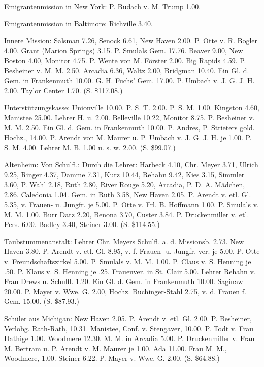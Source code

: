 Emigrantenmission in New York: P. Budach v. M. Trump 1.00.

Emigrantenmission in Baltimore: Richville 3.40.

Innere Mission: Salsman 7.26, Senock 6.61, New Haven 2.00. P. Otte v. R. Bogler 4.00. Grant (Marion Springs) 3.15. P. Smulals Gem. 17.76. Beaver 9.00, New Boston 4.00, Monitor 4.75. P. Wente von M. Förster 2.00. Big Rapids 4.59. P. Besheiner v. M. M. 2.50. Arcadia 6.36, Waltz 2.00, Bridgman 10.40. Ein Gl. d. Gem. in Frankenmuth 10.00. G. H. Fuchs’ Gem. 17.00. P. Umbach v. J. G. J. H. 2.00. Taylor Center 1.70. (S. \$117.08.)

Unterstützungskasse: Unionville 10.00. P. S. T. 2.00. P. S. M. 1.00. Kingston 4.60, Manistee 25.00. Lehrer H. u. 2.00. Belleville 10.22, Monitor 8.75. P. Besheiner v. M. M. 2.50. Ein Gl. d. Gem. in Frankenmuth 10.00. P. Andres, P. Strieters gold. Hochz., 14.00. P. Arendt von M. Maurer u. P. Umbach v. J. G. J. H. je 1.00. P. S. M. 4.00. Lehrer M. B. 1.00 u. s. w. 2.00. (S. \$99.07.)

Altenheim: Von Schulfl.: Durch die Lehrer: Harbeck 4.10, Chr. Meyer 3.71, Ulrich 9.25, Ringer 4.37, Damme 7.31, Kurz 10.44, Rehahn 9.42, Kies 3.15, Simmler 3.60, P. Wahl 2.18, Ruth 2.80, River Rouge 5.20, Arcadia, P. D. A. Mädchen, 2.86, Caledonia 1.04. Gem. in Ruth 3.58, New Haven 2.05. P. Arendt v. etl. Gl. 5.35, v. Frauen- u. Jungfr. je 5.00. P. Otte v. Frl. B. Hoffmann 1.00. P. Smulals v. M. M. 1.00. Burr Datz 2.20, Benona 3.70, Custer 3.84. P. Druckenmiller v. etl. Pers. 6.00. Badley 3.40, Steiner 3.00. (S. \$114.55.)

Taubstummenanstalt: Lehrer Chr. Meyers Schulfl. a. d. Missionsb. 2.73. New Haven 3.80. P. Arendt v. etl. Gl. 8.95, v. f. Frauen- u. Jungfr.-ver. je 5.00. P. Otte v. Freundschaftszirkel 5.00. P. Smulals v. M. M. 1.00. P. Claus v. S. Henning je .50. P. Klaus v. S. Henning je .25. Frauenver. in St. Clair 5.00. Lehrer Rehahn v. Frau Drews u. Schulfl. 1.20. Ein Gl. d. Gem. in Frankenmuth 10.00. Saginaw 20.00. P. Mayer v. Wwe. G. 2.00, Hochz. Buchinger-Stahl 2.75, v. d. Frauen f. Gem. 15.00. (S. \$87.93.)

Schüler aus Michigan: New Haven 2.05. P. Arendt v. etl. Gl. 2.00. P. Besheiner, Verlobg. Rath-Rath, 10.31. Manistee, Conf. v. Stengaver, 10.00. P. Todt v. Frau Dathige 1.00. Woodmere 12.30. M. M. in Arcadia 5.00. P. Druckenmiller v. Frau M. Bertram u. P. Arendt v. M. Maurer je 1.00. Ada 11.00. Frau M. M., Woodmere, 1.00. Steiner 6.22. P. Mayer v. Wwe. G. 2.00. (S. \$64.88.)

